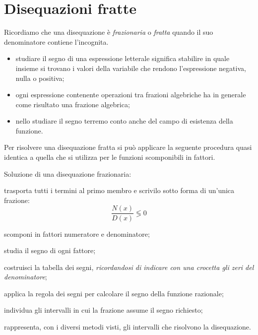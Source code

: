 
\section{Disequazioni fratte}
\label{sec:diseq_fratte}

Ricordiamo che una disequazione è \emph{frazionaria} o \emph{fratta} quando 
il suo denominatore contiene l'incognita. 

\begin{osservazione}{}{}
 \begin{itemize} [nosep]
\item studiare il segno di una espressione letterale significa stabilire in 
quale insieme si trovano i valori della variabile che rendono 
l'espressione negativa, nulla o positiva;
\item ogni espressione contenente operazioni tra frazioni algebriche ha in 
generale come risultato una frazione algebrica;
\item nello studiare il segno terremo conto anche del campo di esistenza 
della funzione.
\end{itemize}
\end{osservazione}

Per risolvere una disequazione fratta si può applicare la seguente procedura 
quasi identica a quella che si utilizza per le funzioni scomponibili in 
fattori.

\begin{procedura}{}{}
Soluzione di una disequazione frazionaria:
\begin{enumeratea}
\item trasporta tutti i termini al primo membro e scrivilo sotto forma di 
 un'unica frazione:\\
\[\frac{N(x)}{D(x)} \lessgtr 0\]
\item scomponi in fattori numeratore e denominatore;
\item studia il segno di ogni fattore;
\item costruisci la tabella dei segni, 
\emph{ricordandosi di indicare con una crocetta gli zeri del denominatore};
\item applica la regola dei segni per calcolare il segno della funzione 
razionale;
\item individua gli intervalli in cui la frazione assume il segno richiesto;
\item rappresenta, con i diversi metodi visti, gli intervalli che 
 risolvono la disequazione.
\end{enumeratea}
\end{procedura}


